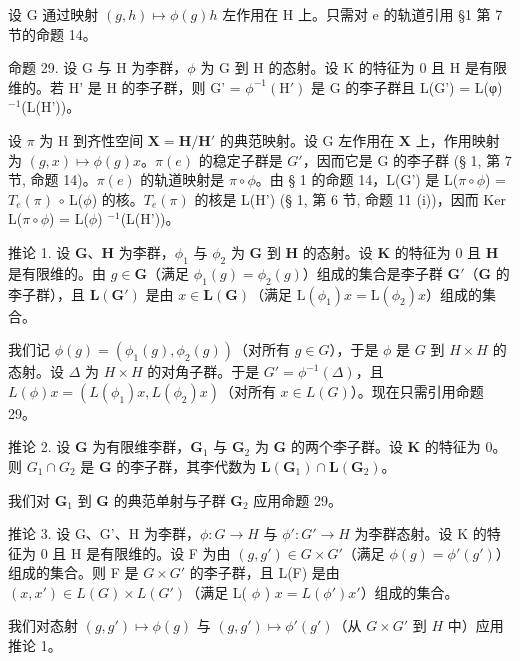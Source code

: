 设 G 通过映射 \((g, h) \mapsto \phi(g)h\) 左作用在 H 上。只需对 e 的轨道引用 §1 第 7 节的命题 14。

命题 29. 设 G 与 H 为李群，\(\phi\) 为 G 到 H 的态射。设 K 的特征为 0 且 H 是有限维的。若 H' 是 H 的李子群，则 G' = \(\phi^{-1}(\mathrm{H}')\) 是 G 的李子群且 L(G') = L(φ)\(^{-1}\)(L(H'))。

设 \(\pi\) 为 H 到齐性空间 \(\mathbf{X} = \mathbf{H} / \mathbf{H}'\) 的典范映射。设 G 左作用在 \(\mathbf{X}\) 上，作用映射为 \((g, x) \mapsto \phi(g)x\)。\(\pi(e)\) 的稳定子群是 \(G'\)，因而它是 G 的李子群 (§ 1, 第 7 节, 命题 14)。\(\pi(e)\) 的轨道映射是 \(\pi \circ \phi\)。由 § 1 的命题 14，L(G') 是 L(\(\pi \circ \phi\)) = \(T_e(\pi)\) \(\circ\) L(\(\phi\)) 的核。\(T_e(\pi)\) 的核是 L(H') (§ 1, 第 6 节, 命题 11 (i))，因而 Ker L(\(\pi \circ \phi\)) = L(\(\phi\)) \(^{-1}\)(L(H'))。

推论 1. 设 \(\mathbf{G}\)、\(\mathbf{H}\) 为李群，\(\phi_1\) 与 \(\phi_2\) 为 \(\mathbf{G}\) 到 \(\mathbf{H}\) 的态射。设 \(\mathbf{K}\) 的特征为 0 且 \(\mathbf{H}\) 是有限维的。由 \(g \in \mathbf{G}\)（满足 \(\phi_1(g) = \phi_2(g)\)）组成的集合是李子群 \(\mathbf{G}'\)（\(\mathbf{G}\) 的李子群），且 \(\mathbf{L}(\mathbf{G}')\) 是由 \(x \in \mathbf{L}(\mathbf{G})\)（满足 \(\mathrm{L}(\phi_1)x = \mathrm{L}(\phi_2)x\)）组成的集合。

我们记 \(\phi(g) = (\phi_1(g), \phi_2(g))\)（对所有 \(g \in G\)），于是 \(\phi\) 是 \(G\) 到 \(H \times H\) 的态射。设 \(\Delta\) 为 \(H \times H\) 的对角子群。于是 \(G' = \phi^{-1}(\Delta)\)，且 \(L(\phi)x = (L(\phi_1)x, L(\phi_2)x)\)（对所有 \(x \in L(G)\)）。现在只需引用命题 29。

推论 2. 设 \(\mathbf{G}\) 为有限维李群，\(\mathbf{G}_1\) 与 \(\mathbf{G}_2\) 为 \(\mathbf{G}\) 的两个李子群。设 \(\mathbf{K}\) 的特征为 0。则 \(G_1 \cap G_2\) 是 \(\mathbf{G}\) 的李子群，其李代数为 \(\mathbf{L}(\mathbf{G}_1) \cap \mathbf{L}(\mathbf{G}_2)\)。

我们对 \(\mathbf{G}_1\) 到 \(\mathbf{G}\) 的典范单射与子群 \(\mathbf{G}_2\) 应用命题 29。

推论 3. 设 G、G'、H 为李群，\(\phi: G \to H\) 与 \(\phi': G' \to H\) 为李群态射。设 K 的特征为 0 且 H 是有限维的。设 F 为由 \((g, g') \in G \times G'\)（满足 \(\phi(g) = \phi'(g')\)）组成的集合。则 F 是 \(G \times G'\) 的李子群，且 L(F) 是由 \((x, x') \in L(G) \times L(G')\)（满足 L( \(\phi\) ) \(x = L(\phi')x'\)）组成的集合。

我们对态射 \((g, g') \mapsto \phi(g)\) 与 \((g, g') \mapsto \phi'(g')\)（从 \(G \times G'\) 到 \(H\) 中）应用推论 1。

